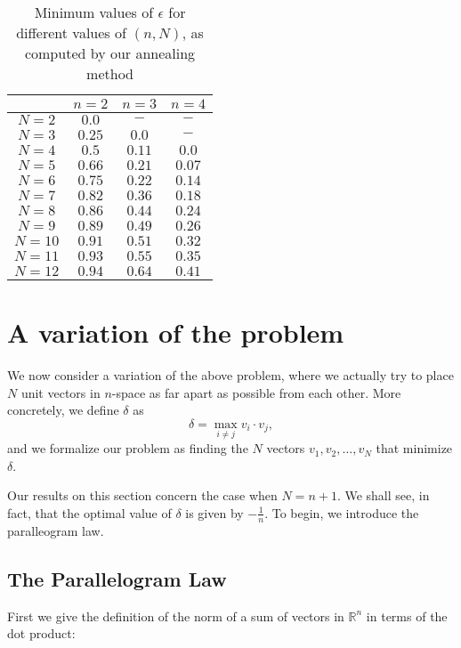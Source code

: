 \documentclass[11pt,letterpaper,twoside,english]{article}
\theoremstyle{theorem}
\theoremstyle{remark}
\providecommand{\R}{\mathbb{R}}
\begin{document}
\begin{table}
   \centering
    \begin{tabular}{ | c | c | c | c |}
    \hline
      & $n=2$ & $n=3$ & $n=4$ \\ \hline
    $N=2$ & $0.0$ & $-$ & $-$ \\ \hline
    $N=3$ & $0.25$ & $0.0$ & $-$ \\ \hline
    $N=4$ & $0.5$ & $0.11$ & $0.0$ \\ \hline
    $N=5$ & $0.66$ & $0.21$ & $0.07$ \\ \hline
    $N=6$ & $0.75$ & $0.22$ & $0.14$ \\ \hline
    $N=7$ & $0.82$ & $0.36$ & $0.18$ \\ \hline
    $N=8$ &  $0.86$ & $0.44$ & $0.24$ \\ \hline
    $N=9$ &  $0.89$ & $0.49$ & $0.26$ \\ \hline
    $N=10$ & $0.91$ & $0.51$ & $0.32$ \\ \hline
    $N=11$ & $0.93$  & $0.55$ & $0.35$ \\ \hline
    $N=12$ & $0.94$ & $0.64$ & $0.41$ \\
    \hline
    \end{tabular}
    \caption {Minimum values of $\epsilon$ for different values of $(n, N)$, as computed by our annealing method}
\end{table}



\section{A variation of the problem}

We now consider a variation of the above problem, where we actually try to place $N$ unit vectors in $n$-space as far apart as possible from each other. More concretely, we define $\delta$ as
$$\delta = \max_{i \neq j} v_i \cdot v_j,$$
and we formalize our problem as finding the $N$ vectors $v_1, v_2, \ldots, v_N$ that minimize $\delta$.

Our results on this section concern the case when $N=n+1$. We shall see, in fact, that the optimal value of $\delta$ is given by $-\frac{1}{n}$. To begin, we introduce the paralleogram law.

\subsection{The Parallelogram Law}

First we give the definition of the norm of a sum of vectors in $\R^n$ in terms of the dot product:
\end{document}
